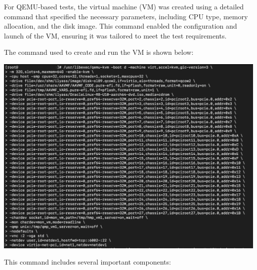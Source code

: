 For QEMU-based tests, the virtual machine (VM) was created using a detailed command that specified the necessary parameters, including CPU type, memory allocation, and the disk image. This command enabled the configuration and launch of the VM, ensuring it was tailored to meet the test requirements.\mynewline

The command used to create and run the VM is shown below:

\begin{center}
    \centering
    \includegraphics[width=\textwidth]{Images/VM Creation with QEMU.png}
    \label{fig}
\end{center}

This command includes several important components:

